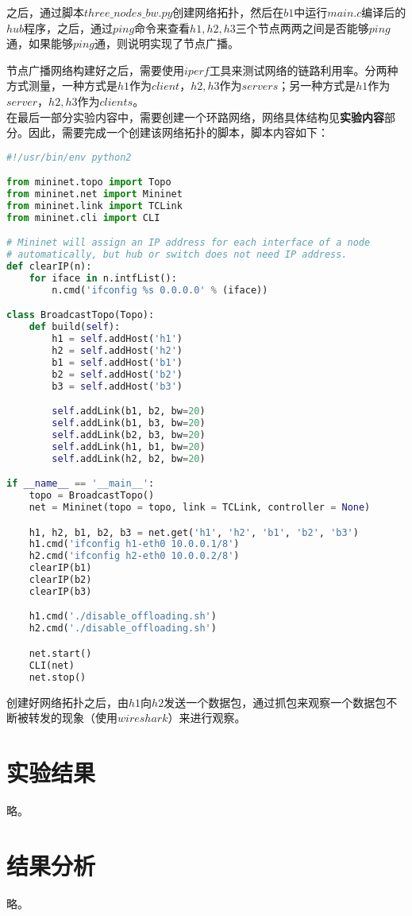 \documentclass[UTF8,noindent]{ctexart}
\begin{document}
之后，通过脚本$three\_nodes\_bw.py$创建网络拓扑，然后在$b1$中运行$main.c$编译后的$hub$程序，之后，通过$ping$命令来查看$h1, h2, h3$三个节点两两之间是否能够$ping$通，如果能够$ping$通，则说明实现了节点广播。

节点广播网络构建好之后，需要使用$iperf$工具来测试网络的链路利用率。分两种方式测量，一种方式是$h1$作为$client$，$h2, h3$作为$servers$；另一种方式是$h1$作为$server$，$h2, h3$作为$clients$。\\

在最后一部分实验内容中，需要创建一个环路网络，网络具体结构见\textbf{实验内容}部分。因此，需要完成一个创建该网络拓扑的脚本，脚本内容如下：
\begin{lstlisting}[language = Python]
#!/usr/bin/env python2

from mininet.topo import Topo
from mininet.net import Mininet
from mininet.link import TCLink
from mininet.cli import CLI

# Mininet will assign an IP address for each interface of a node
# automatically, but hub or switch does not need IP address.
def clearIP(n):
    for iface in n.intfList():
        n.cmd('ifconfig %s 0.0.0.0' % (iface))

class BroadcastTopo(Topo):
    def build(self):
        h1 = self.addHost('h1')
        h2 = self.addHost('h2')
        b1 = self.addHost('b1')
        b2 = self.addHost('b2')
        b3 = self.addHost('b3')

        self.addLink(b1, b2, bw=20)
        self.addLink(b1, b3, bw=20)
        self.addLink(b2, b3, bw=20)
        self.addLink(h1, b1, bw=20)
        self.addLink(h2, b2, bw=20)

if __name__ == '__main__':
    topo = BroadcastTopo()
    net = Mininet(topo = topo, link = TCLink, controller = None)

    h1, h2, b1, b2, b3 = net.get('h1', 'h2', 'b1', 'b2', 'b3')
    h1.cmd('ifconfig h1-eth0 10.0.0.1/8')
    h2.cmd('ifconfig h2-eth0 10.0.0.2/8')
    clearIP(b1)
    clearIP(b2)
    clearIP(b3)

    h1.cmd('./disable_offloading.sh')
    h2.cmd('./disable_offloading.sh')

    net.start()
    CLI(net)
    net.stop()
\end{lstlisting}
创建好网络拓扑之后，由$h1$向$h2$发送一个数据包，通过抓包来观察一个数据包不断被转发的现象（使用$wireshark$）来进行观察。

\section*{{实验结果}}
略。
		\section*{{结果分析}}
		略。
			
\end{document}
